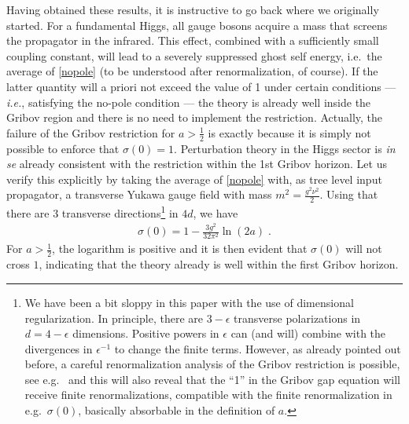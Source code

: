 Having obtained these results, it is instructive to go back where we originally started. For a fundamental Higgs, all gauge bosons acquire a mass that screens the propagator in the infrared. This effect, combined with a sufficiently small coupling constant, will lead to a severely suppressed ghost self energy, i.e.~the average of \eqref{nopole} (to be understood after renormalization, of course). If the latter quantity will a priori not exceed the value of 1 under certain conditions --- {\it i.e.}, satisfying the no-pole condition --- the theory is already well inside the Gribov region and there is no need to implement the restriction. Actually, the failure of the Gribov restriction for $a>\frac{1}{2}$ is exactly because it is simply not possible to enforce that $\sigma(0)=1$. Perturbation theory in the Higgs sector is \emph{in se} already consistent with the restriction within the 1st Gribov horizon. Let us verify this explicitly by taking the average of \eqref{nopole} with, as tree level input propagator, a transverse Yukawa gauge field with mass $m^2=\frac{g^2\nu^2}{2}$. Using that there are 3 transverse directions\footnote{We have been a bit sloppy in this paper with the use of dimensional regularization. In principle, there are $3-\epsilon$ transverse polarizations in $d=4-\epsilon$ dimensions. Positive powers in $\epsilon$ can (and will) combine with the divergences in $\epsilon^{-1}$ to change the finite terms. However, as already pointed out before, a careful renormalization analysis of the Gribov restriction is possible, see e.g.~\cite{Dudal:2010fq,Vandersickel:2012tz} and this will also reveal that the ``1'' in the Gribov gap equation will receive finite renormalizations, compatible with the finite renormalization in e.g.~$\sigma(0)$, basically absorbable  in the definition of $a$. } in $4d$, we have
\begin{eqnarray}
\sigma(0) =1-\frac{3g^2}{32\pi^2}\ln(2a)\;.
\end{eqnarray}
For $a>\frac{1}{2}$, the logarithm is positive and it is then evident that $\sigma(0)$ will not cross $1$, indicating that the theory already is well within the first Gribov horizon.


